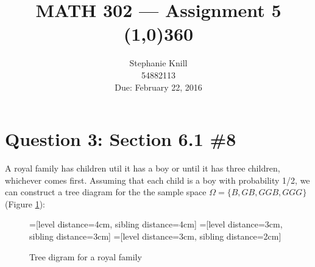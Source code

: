 \documentclass[11pt, oneside]{article}   	%
\begin{document}
\title{MATH 302 --- Assignment 5 \\
\line(1,0){360} \\              %
}
\author{
Stephanie Knill \\
54882113 \\
Due: February 22, 2016}

\date{}                   %
\maketitle




\section*{Question 3: Section 6.1 \#8}

A royal family has children util it has a boy or until it has three children, whichever comes first. Assuming that each child is a boy with probability 1/2, we can construct a tree diagram for the the sample space $\Omega = \{B, GB, GGB, GGG\}$ (Figure \ref{tree}):

\begin{figure}[h]
\usetikzlibrary{positioning}

=[level distance=4cm, sibling distance=4cm]
=[level distance=3cm, sibling distance=3cm]
=[level distance=3cm, sibling distance=2cm]


\caption{Tree digram for a royal family}
\label{tree}
\end{figure}
\end{document}
